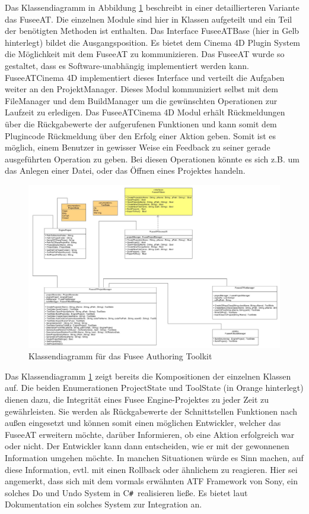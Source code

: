 \documentclass[pagesize, paper=a4, fontsize=12pt, titlepage=true, headings=small, headnosepline, abstractoff, liststotoc, nochapterprefix, plainheadsepline, twoside]{scrreprt}
\newcommand{\CSS}{C\texttt{\# }}
\begin{document}
Das Klassendiagramm in Abbildung \ref{FuseeATKlassendiagramm} beschreibt in einer detaillierteren Variante das FuseeAT. Die einzelnen Module sind hier in Klassen aufgeteilt und ein Teil der benötigten Methoden ist enthalten. Das Interface FuseeATBase (hier in Gelb hinterlegt) bildet die Ausgangsposition. Es bietet dem Cinema 4D Plugin System die Möglichkeit mit dem FuseeAT zu kommunizieren. Das FuseeAT wurde so gestaltet, dass es Software-unabhängig implementiert werden kann. FuseeATCinema 4D implementiert dieses Interface und verteilt die Aufgaben weiter an den ProjektManager. Dieses Modul kommuniziert selbst mit dem FileManager und dem BuildManager um die gewünschten Operationen zur Laufzeit zu erledigen. Das FuseeATCinema 4D Modul erhält Rückmeldungen über die Rückgabewerte der aufgerufenen Funktionen und kann somit dem Plugincode Rückmeldung über den Erfolg einer Aktion geben. Somit ist es möglich, einem Benutzer in gewisser Weise ein Feedback zu seiner gerade ausgeführten Operation zu geben. Bei diesen Operationen könnte es sich z.B. um das Anlegen einer Datei, oder das Öffnen eines Projektes handeln.
\begin{figure}[ht]
	\centering
	\includegraphics[width=\linewidth]{Bilder/Klassendiagramm_FuseeAT.jpg}
	\caption{Klassendiagramm für das Fusee Authoring Toolkit}
	\label{FuseeATKlassendiagramm}
\end{figure}
Das Klassendiagramm \ref{FuseeATKlassendiagramm} zeigt bereits die Kompositionen der einzelnen Klassen auf. Die beiden Enumerationen ProjectState und ToolState (in Orange hinterlegt) dienen dazu, die Integrität eines Fusee Engine-Projektes zu jeder Zeit zu gewährleisten. Sie werden als Rückgabewerte der Schnittstellen Funktionen nach außen eingesetzt und können somit einen möglichen Entwickler, welcher das FuseeAT erweitern möchte, darüber Informieren, ob eine Aktion erfolgreich war oder nicht. Der Entwickler kann dann entscheiden, wie er mit der gewonnenen Information umgehen möchte. In manchen Situationen würde es Sinn machen, auf diese Information, evtl. mit einen Rollback oder ähnlichem zu reagieren. Hier sei angemerkt, dass sich mit dem vormals erwähnten ATF Framework von Sony, ein solches Do und Undo System in \CSS realisieren ließe. Es bietet laut Dokumentation ein solches System zur Integration an.
\end{document}
